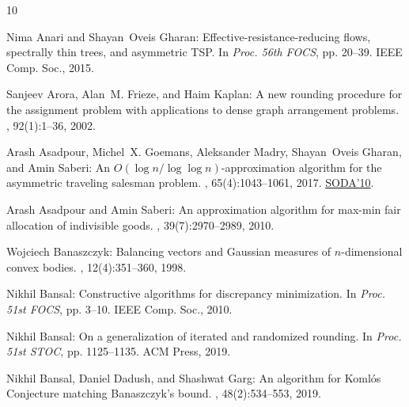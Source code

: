 \documentclass[11pt]{article}
\theoremstyle{definition}
\begin{document}
\tocrefpdfbookmark
\begin{thebibliography}{10}

{\sc Nima Anari and Shayan~Oveis Gharan}: Effective-resistance-reducing flows,
  spectrally thin trees, and asymmetric {TSP}.
\newblock In {\em Proc. 56th FOCS}, pp. 20--39. IEEE Comp. Soc., 2015.

{\sc Sanjeev Arora, Alan~M. Frieze, and Haim Kaplan}: A new rounding procedure
  for the assignment problem with applications to dense graph arrangement
  problems.
, 92(1):1--36, 2002.
\newblock [\epfmtdoi{10.1007/s101070100271}]

{\sc Arash Asadpour, Michel~X. Goemans, Aleksander Madry, Shayan~Oveis Gharan,
  and Amin Saberi}: An ${O}(\log n/ \log \log n)$-approximation algorithm for
  the asymmetric traveling salesman problem.
, 65(4):1043--1061, 2017.
\newblock \prelim \href{https:/doi.org/10.1137/1.9781611973075.32}{SODA'10}.

{\sc Arash Asadpour and Amin Saberi}: An approximation algorithm for max-min
  fair allocation of indivisible goods.
, 39(7):2970--2989, 2010.
\newblock [\epfmtdoi{10.1137/080723491}]

{\sc Wojciech Banaszczyk}: Balancing vectors and {G}aussian measures of
  $n$-dimensional convex bodies.
, 12(4):351--360, 1998.

{\sc Nikhil Bansal}: Constructive algorithms for discrepancy minimization.
\newblock In {\em Proc. 51st FOCS}, pp. 3--10. IEEE Comp. Soc., 2010.

{\sc Nikhil Bansal}: On a generalization of iterated and randomized rounding.
\newblock In {\em Proc. 51st STOC}, pp. 1125--1135. ACM Press, 2019.
\newblock [\epfmtdoi{10.1145/3313276.3316313}]

{\sc Nikhil Bansal, Daniel Dadush, and Shashwat Garg}: An algorithm for
  {K}oml{\'{o}}s {C}onjecture matching {B}anaszczyk's bound.
, 48(2):534--553, 2019.
\newblock [\epfmtdoi{10.1137/17M1126795}]


\end{thebibliography}
\end{document}
